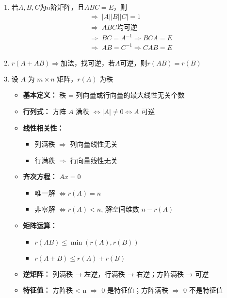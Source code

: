 \documentclass[a4paper,12pt]{article}
\begin{document}
\begin{enumerate}
        \item 若$A, B, C$为$n$阶矩阵，且$ABC = E$，则
        \begin{align*}
            &\Rightarrow\; |A||B||C| = 1 \\
            &\Rightarrow\; A B C\text{均可逆} \\
            &\Rightarrow\; BC = A^{-1} \Rightarrow BCA = E \\
            &\Rightarrow\; AB = C^{-1} \Rightarrow CAB = E
        \end{align*}
        \item $r(A + AB) \Rightarrow \text{加法，找可逆，若}A\text{可逆，则}r(AB) = r(B)$
        \item 设 $A$ 为 $m \times n$ 矩阵，$r(A)$ 为秩
        \begin{itemize}
            \item \textbf{基本定义：} 秩 = 列向量或行向量的最大线性无关个数
            \item \textbf{行列式：} 方阵 $A$ 满秩 $\Leftrightarrow |A| \neq 0 \Leftrightarrow A$ 可逆
            \item \textbf{线性相关性：}
            \begin{itemize}
                \item 列满秩 $\Rightarrow$ 列向量线性无关
                \item 行满秩 $\Rightarrow$ 行向量线性无关
            \end{itemize}
            \item \textbf{齐次方程：} $Ax = 0$
            \begin{itemize}
                \item 唯一解 $\Leftrightarrow r(A) = n$
                \item 非零解 $\Leftrightarrow r(A) < n$, 解空间维数 $n - r(A)$
            \end{itemize}
            \item \textbf{矩阵运算：}
            \begin{itemize}
                \item $r(AB) \le \min(r(A), r(B))$
                \item $r(A+B) \le r(A) + r(B)$
            \end{itemize}
            \item \textbf{逆矩阵：} 列满秩 → 左逆，行满秩 → 右逆；方阵满秩 → 可逆
            \item \textbf{特征值：} 方阵秩 < n $\Rightarrow$ 0 是特征值；方阵满秩 $\Rightarrow$ 0 不是特征值
        \end{itemize}
    \end{enumerate}
\end{document}
